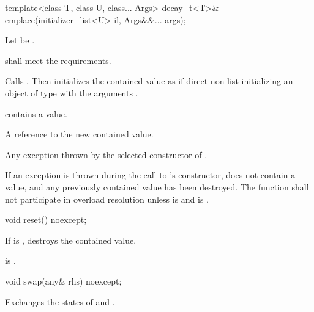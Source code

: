 %
\begin{itemdecl}
template<class T, class U, class... Args>
  decay_t<T>& emplace(initializer_list<U> il, Args&&... args);
\end{itemdecl}

\begin{itemdescr}
\pnum
Let  be .

\pnum
\requires
{} shall meet the  requirements.

\pnum
\effects
Calls . Then initializes the contained value
as if direct-non-list-initializing an object of type  with the arguments
.

\pnum
\ensures
{} contains a value.

\pnum
\returns
A reference to the new contained value.

\pnum
\throws
Any exception thrown by the selected constructor of .

\pnum
\remarks
If an exception is thrown during the call to 's constructor,
 does not contain a value, and any previously contained value
has been destroyed.
The function shall not participate in overload resolution unless
 is  and
 is .
\end{itemdescr}

%
\begin{itemdecl}
void reset() noexcept;
\end{itemdecl}

\begin{itemdescr}
\pnum
\effects
If  is , destroys the contained value.

\pnum
\ensures
{} is .
\end{itemdescr}

%
\begin{itemdecl}
void swap(any& rhs) noexcept;
\end{itemdecl}

\begin{itemdescr}

\pnum
\effects
Exchanges the states of  and .
\end{itemdescr}

